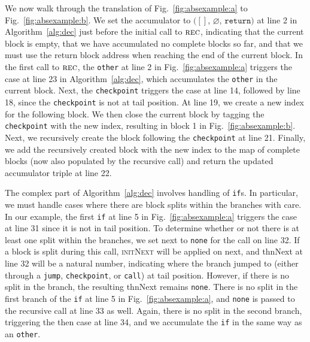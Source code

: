 \documentclass[runningheads]{llncs}
\newcommand{\ttt}{\texttt}
\begin{document}
We now walk through the translation of Fig.~\ref{fig:absexample:a} to Fig.~\ref{fig:absexample:b}.
We set the accumulator to $([]$, $\varnothing$, $\ttt{return})$ at line 2 in Algorithm~\ref{alg:dec} just before the initial call to $\textsc{rec}$, indicating that the current block is empty, that we have accumulated no complete blocks so far, and that we must use the return block address when reaching the end of the current block.
In the first call to $\textsc{rec}$, the \ttt{other} at line 2 in Fig.~\ref{fig:absexample:a} triggers the case at line 23 in Algorithm~\ref{alg:dec}, which accumulates the \ttt{other} in the current block.
Next, the \ttt{checkpoint} triggers the case at line 14, followed by line 18, since the \ttt{checkpoint} is not at tail position.
At line 19, we create a new index for the following block.
We then close the current block by tagging the \ttt{checkpoint} with the new index, resulting in block 1 in Fig.~\ref{fig:absexample:b}.
Next, we recursively create the block following the \ttt{checkpoint} at line 21.
Finally, we add the recursively created block with the new index to the map of complete blocks (now also populated by the recursive call) and return the updated accumulator triple at line 22.

The complex part of Algorithm~\ref{alg:dec} involves handling of \texttt{if}s.
In particular, we must handle cases where there are block splits within the branches with care.
In our example, the first \ttt{if} at line 5 in Fig.~\ref{fig:absexample:a} triggers the case at line 31 since it is not in tail position.
To determine whether or not there is at least one split within the branches, we set \textsf{next} to \ttt{none} for the call on line 32.
If a block is split during this call, \textsc{initNext} will be applied on \textsf{next}, and \textsf{thnNext} at line 32 will be a natural number, indicating where the branch jumped to (either through a \ttt{jump}, \ttt{checkpoint}, or \ttt{call}) at tail position.
However, if there is no split in the branch, the resulting \textsf{thnNext} remains \ttt{none}.
There is no split in the first branch of the \ttt{if} at line 5 in Fig.~\ref{fig:absexample:a}, and \ttt{none} is passed to the recursive call at line 33 as well.
Again, there is no split in the second branch, triggering the then case at line 34, and we accumulate the \ttt{if} in the same way as an \ttt{other}.
\end{document}
